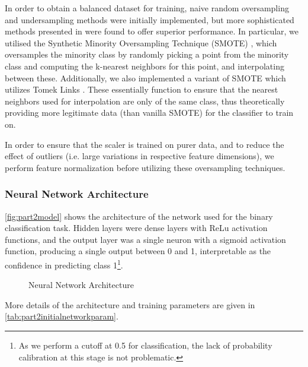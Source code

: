 In order to obtain a balanced dataset for training, naive random oversampling and undersampling methods were initially implemented, but more sophisticated methods presented in \cite{smote-comparison} were found to offer superior performance. In particular, we utilised the Synthetic Minority Oversampling Technique (SMOTE) \cite{Smote}, which oversamples the minority class by randomly picking a point from the minority class and computing the k-nearest neighbors for this point, and interpolating between these. Additionally, we also implemented a variant of SMOTE which utilizes Tomek Links \cite{smotetomek}. These essentially function to ensure that the nearest neighbors used for interpolation are only of the same class, thus theoretically providing more legitimate data (than vanilla SMOTE) for the classifier to train on. 

In order to ensure that the scaler is trained on purer data, and to reduce the effect of outliers (i.e. large variations in respective feature dimensions), we perform feature normalization before utilizing these oversampling techniques.

\subsubsection*{Neural Network Architecture}
\autoref{fig:part2model} shows the architecture of the network used for the binary classification task. Hidden layers were dense layers with ReLu activation functions, and the output layer was a single neuron with a sigmoid activation function, producing a single output between 0 and 1, interpretable as the confidence in predicting class 1\footnote{As we perform a cutoff at 0.5 for classification, the lack of probability calibration at this stage is not problematic.}. 
\begin{figure}[h!]
    \centering
    \caption{Neural Network Architecture}
    \label{fig:part2model}
\end{figure}
\noindent
More details of the architecture and training parameters are given in \autoref{tab:part2initialnetworkparam}.


